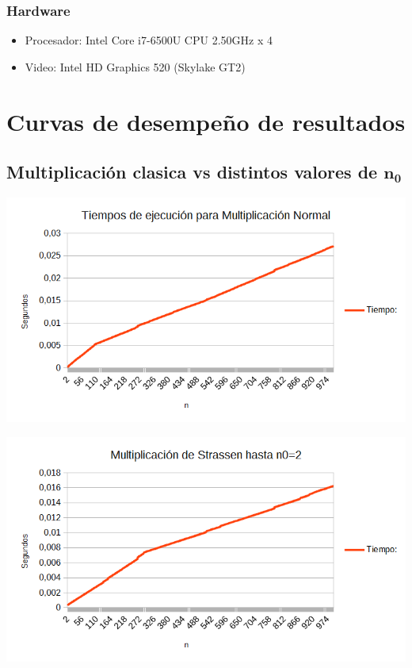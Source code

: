 \documentclass[12pt,letterpaper]{scrartcl}
\begin{document}
\subsubsection{Hardware}
\begin{itemize}
\item Procesador: Intel Core i7-6500U CPU  2.50GHz x 4
\item Video: Intel HD Graphics 520 (Skylake GT2)
\end{itemize}
\newpage



\section{Curvas de desempeño de resultados}

\subsection{Multiplicación clasica vs distintos valores de $\mathbf{n_0}$}
\includegraphics[scale=0.6]{normal.png} 

\includegraphics[scale=0.6]{n0-2.png} 
\end{document}
